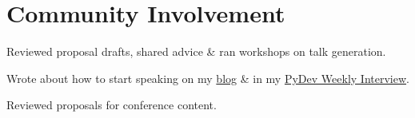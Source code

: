 \documentclass[letterpaper]{deedy-resume} %
\begin{document}
\begin{minipage}[t]{0.66\textwidth}
\sectionspace %
\vspace{-0.8\baselineskip}
%
%

\section{Community Involvement}

%
\begin{tightitemize}
\item Reviewed proposal drafts, shared advice \& ran workshops on talk generation.
\item Wrote about how to start speaking on my \href{}{blog} \& in my \href{}{PyDev Weekly Interview}.
\end{tightitemize}
%
\sectionspace %


%
\begin{tightitemize}
\item Reviewed proposals for conference content.
\end{tightitemize}
%
\sectionspace %
\vspace{0.2\baselineskip}


\end{minipage}
\end{document}
